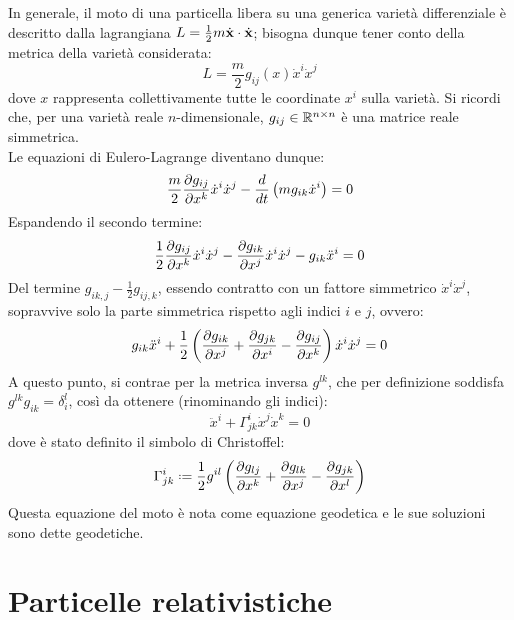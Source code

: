 In generale, il moto di una particella libera su una generica varietà differenziale è descritto dalla lagrangiana $ L = \frac{1}{2}m \dot{\mathbf{x}}\cdot\dot{\mathbf{x}} $; bisogna dunque tener conto della metrica della varietà considerata:
\begin{equation}
  L = \frac{m}{2} g_{ij}(x) \dot{x}^i \dot{x}^j
  \label{eq:1.4}
\end{equation}
dove $ x $ rappresenta collettivamente tutte le coordinate $ x^i $ sulla varietà. Si ricordi che, per una varietà reale $ n $-dimensionale, $ g_{ij}\in\mathbb{R}^{n\times n} $ è una matrice reale simmetrica.\\
Le equazioni di Eulero-Lagrange diventano dunque:
\begin{equation}
  \frac{m}{2} \frac{\partial g_{ij}}{\partial x^k} \dot{x}^i \dot{x}^j - \frac{d}{dt} \left( m g_{ik} \dot{x}^i \right) = 0
  \label{eq:1.5}
\end{equation}
Espandendo il secondo termine:
\begin{equation}
  \frac{1}{2} \frac{\partial g_{ij}}{\partial x^k} \dot{x}^i \dot{x}^j - \frac{\partial g_{ik}}{\partial x^j} \dot{x}^i \dot{x}^j - g_{ik} \ddot{x}^i = 0
  \label{eq:1.6}
\end{equation}
Del termine $ g_{ik,j} - \frac{1}{2} g_{ij,k} $, essendo contratto con un fattore simmetrico $ \dot{x}^i \dot{x}^j $, sopravvive solo la parte simmetrica rispetto agli indici $ i $ e $ j $, ovvero:
\begin{equation}
  g_{ik} \ddot{x}^i + \frac{1}{2}\left( \frac{\partial g_{ik}}{\partial x^j} + \frac{\partial g_{jk}}{\partial x^i} - \frac{\partial g_{ij}}{\partial x^k} \right) \dot{x}^i \dot{x}^j = 0
  \label{eq:1.7}
\end{equation}
A questo punto, si contrae per la metrica inversa $ g^{lk} $, che per definizione soddisfa $ g^{lk} g_{ik} = \delta^l_i $, così da ottenere (rinominando gli indici):
\begin{equation}
  \ddot{x}^i + \Gamma^i_{jk} \dot{x}^j \dot{x}^k = 0
  \label{eq:1.8}
\end{equation}
dove è stato definito il simbolo di Christoffel:
\begin{equation}
  \Gamma^i_{jk} \defeq \frac{1}{2} g^{il} \left( \frac{\pa g_{lj}}{\pa x^k} + \frac{\pa g_{lk}}{\pa x^j} - \frac{\pa g_{jk}}{\pa x^l} \right)
  \label{eq:1.9}
\end{equation}
Questa equazione del moto è nota come equazione geodetica e le sue soluzioni sono dette geodetiche.

\section{Particelle relativistiche}










